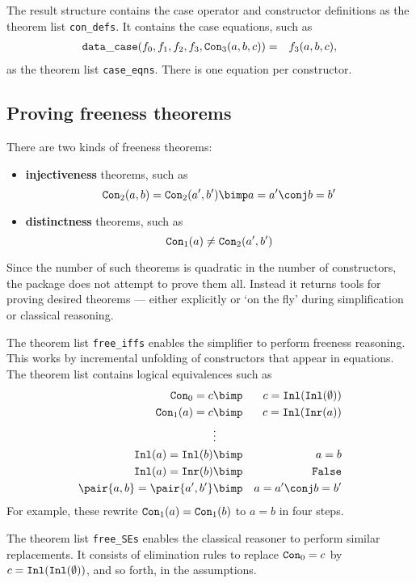 The result structure contains the case operator and constructor definitions as
the theorem list \verb|con_defs|. It contains the case equations, such as 
\begin{eqnarray*}
  {\tt data\_case}(f_0,f_1,f_2,f_3,{\tt Con}_3(a,b,c)) & = & f_3(a,b,c),
\end{eqnarray*}
as the theorem list \verb|case_eqns|.  There is one equation per constructor.

\subsection{Proving freeness theorems}
There are two kinds of freeness theorems:
\begin{itemize}
\item {\bf injectiveness} theorems, such as
\[ \Con_2(a,b) = \Con_2(a',b') \bimp a=a' \conj b=b' \]

\item {\bf distinctness} theorems, such as
\[ {\tt Con}_1(a) \not= {\tt Con}_2(a',b')  \]
\end{itemize}
Since the number of such theorems is quadratic in the number of constructors,
the package does not attempt to prove them all.  Instead it returns tools for
proving desired theorems --- either explicitly or `on the fly' during
simplification or classical reasoning.

The theorem list \verb|free_iffs| enables the simplifier to perform freeness
reasoning.  This works by incremental unfolding of constructors that appear in
equations.  The theorem list contains logical equivalences such as
\begin{eqnarray*}
  \Con_0=c      & \bimp &  c=\Inl(\Inl(\emptyset))     \\
  \Con_1(a)=c   & \bimp &  c=\Inl(\Inr(a))             \\
                & \vdots &                             \\
  \Inl(a)=\Inl(b)   & \bimp &  a=b                     \\
  \Inl(a)=\Inr(b)   & \bimp &  {\tt False}             \\
  \pair{a,b} = \pair{a',b'} & \bimp & a=a' \conj b=b'
\end{eqnarray*}
For example, these rewrite ${\tt Con}_1(a)={\tt Con}_1(b)$ to $a=b$ in four steps.

The theorem list \verb|free_SEs| enables the classical
reasoner to perform similar replacements.  It consists of elimination rules
to replace ${\tt Con}_0=c$ by $c={\tt Inl}({\tt Inl}(\emptyset))$, and so forth, in the
assumptions.

